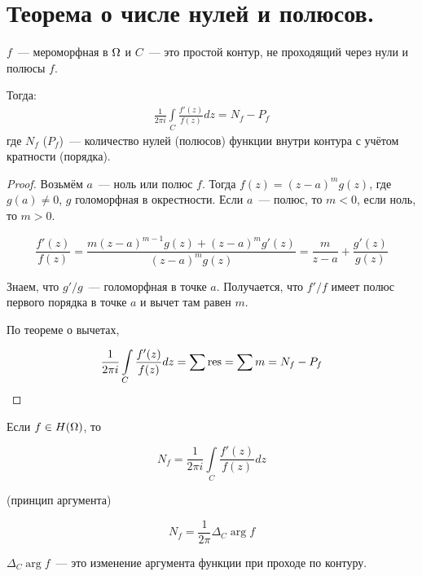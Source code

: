\section{Теорема о числе нулей и полюсов.}

\begin{theorem}
    $f$~--- мероморфная в $\Omega$ и $C$~---
    это простой контур, не проходящий через нули и
    полюсы $f$.

    Тогда:
    \begin{gather*}
        \frac{1}{2\pi i}\int\limits_C \frac{f'(z)}{f(z)}dz = N_f - P_f
    \end{gather*}
    где $N_f$ ($P_f$)~---
    количество нулей (полюсов) функции внутри контура
    с учётом кратности (порядка).
\end{theorem}

\begin{proof}
    Возьмём $a$~--- ноль или полюс $f$.
    Тогда $f(z) = (z-a)^m g(z)$,
    где $g(a) \ne 0$, $g$ голоморфная в окрестности.
    Если $a$~--- полюс, то $m < 0$, если ноль, то $m > 0$.

    \[
        \frac{f'(z)}{f(z)}
        = \frac{m(z-a)^{m-1} g(z) + (z-a)^mg'(z)}{(z-a)^mg(z)}
        = \frac{m}{z-a} + \frac{g'(z)}{g(z)}
    \]

    Знаем, что $g'/g$~--- голоморфная в точке $a$.
    Получается, что $f'/f$ имеет полюс первого порядка
    в точке $a$ и вычет там равен $m$.

    По теореме о вычетах,

    \[
        \frac{1}{2\pi i}\int\limits_C \frac{f'(z)}{f(z)}dz
        = \sum\operatorname*{res} = \sum m = N_f - P_f
    \]
\end{proof}

\begin{consequence}
    Если $f\in H(\Omega)$, то

    \[N_f = \frac{1}{2\pi i}\int\limits_C
        \frac{f'(z)}{f(z)}dz\]
\end{consequence}

\begin{consequence}(принцип аргумента)

    \[
        N_f = \frac{1}{2\pi}\Delta_C\arg f
    \]

    $\Delta_C \arg f$~--- это изменение аргумента
    функции при проходе по контуру.
\end{consequence}


\newpage

